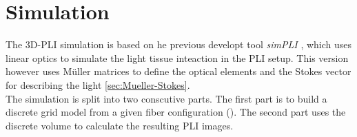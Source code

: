 \chapter{Simulation}
\label{cha:simulation}
% 
%
The \ac{3D-PLI} simulation is based on he previous developt tool \textit{simPLI} \cite{Dohmen2015}, which uses linear optics \cite{} to simulate the light tissue inteaction in the \ac{PLI} setup. This version however uses M\"uller matrices \cite{} to define the optical elements and the Stokes vector \cite{} for describing the light \cref{sec:Mueller-Stokes}.\\
% 
The simulation is split into two conscutive parts.
The first part is to build a discrete grid model from a given fiber configuration (\eg \dummy).
The second part uses the discrete volume to calculate the resulting \acs{PLI} images.
%
%
%
